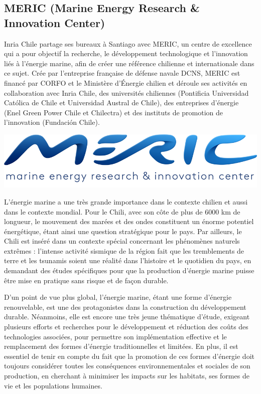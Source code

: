 \subsection{MERIC (Marine Energy Research \& Innovation Center)}

\indent Inria Chile partage ses bureaux à Santiago avec MERIC, un centre de excellence qui a pour objectif la recherche, le développement technologique et l'innovation liés à l'énergie marine, afin de créer une référence chilienne et internationale dans ce sujet. Crée par l'entreprise française de défense navale DCNS, MERIC est financé par CORFO et le Ministère d'Énergie chilien et déroule ses activités en collaboration avec Inria Chile, des universités chiliennes (Pontificia Universidad Católica de Chile et Universidad Austral de Chile), des entreprises d'énergie (Enel Green Power Chile et Chilectra) et des instituts de promotion de l'innovation (Fundación Chile).  

\indent

\indent

\begingroup
\centering
\includegraphics[scale=.3]{figures/logos/meric.png}
\endgroup

\indent

\indent L'énergie marine a une très grande importance dans le contexte chilien et aussi dans le contexte mondial. Pour le Chili, avec son côte de plus de 6000 km de longueur, le mouvement des marées et des ondes constituent un énorme potentiel énergétique, étant ainsi une question stratégique pour le pays. Par ailleurs, le Chili est inséré dans un contexte spécial concernant les phénomènes naturels extrêmes : l'intense activité sismique de la région fait que les tremblements de terre et les tsunamis soient une réalité dans l'histoire et le quotidien du pays, en demandant des études spécifiques pour que la production d'énergie marine puisse être mise en pratique sans risque et de façon durable.

\indent D'un point de vue plus global, l'énergie marine, étant une forme d'énergie renouvelable, est une des protagonistes dans la construction du développement durable. Néanmoins, elle est encore une très jeune thématique d'étude, exigeant plusieurs efforts et recherches pour le développement et réduction des coûts des technologies associées, pour permettre son implémentation effective et le remplacement des formes d'énergie traditionnelles et limitées. En plus, il est essentiel de tenir en compte du fait que la promotion de ces formes d'énergie doit toujours considérer toutes les conséquences environnementales et sociales de son production, en cherchant à minimiser les impacts sur les habitats, ses formes de vie et les populations humaines.

